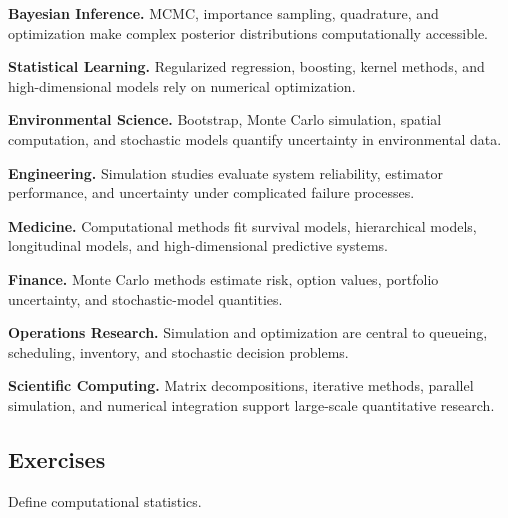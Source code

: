 \begin{applicationbox}

\textbf{Bayesian Inference.}
MCMC, importance sampling, quadrature, and optimization make complex
posterior distributions computationally accessible.

\medskip

\textbf{Statistical Learning.}
Regularized regression, boosting, kernel methods, and high-dimensional
models rely on numerical optimization.

\medskip

\textbf{Environmental Science.}
Bootstrap, Monte Carlo simulation, spatial computation, and stochastic
models quantify uncertainty in environmental data.

\medskip

\textbf{Engineering.}
Simulation studies evaluate system reliability, estimator performance,
and uncertainty under complicated failure processes.

\medskip

\textbf{Medicine.}
Computational methods fit survival models, hierarchical models,
longitudinal models, and high-dimensional predictive systems.

\medskip

\textbf{Finance.}
Monte Carlo methods estimate risk, option values, portfolio uncertainty,
and stochastic-model quantities.

\medskip

\textbf{Operations Research.}
Simulation and optimization are central to queueing, scheduling,
inventory, and stochastic decision problems.

\medskip

\textbf{Scientific Computing.}
Matrix decompositions, iterative methods, parallel simulation, and
numerical integration support large-scale quantitative research.

\end{applicationbox}

\subsection{Exercises}
\label{subsec:computational-statistics-exercises}

\begin{exercise}[1]
Define computational statistics.
\end{exercise}

